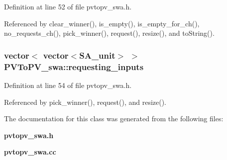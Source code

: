 Definition at line 52 of file pvtopv\_\-swa.h.

Referenced by clear\_\-winner(), is\_\-empty(), is\_\-empty\_\-for\_\-ch(), no\_\-requests\_\-ch(), pick\_\-winner(), request(), resize(), and toString().
\subsubsection[{requesting\_\-inputs}]{\setlength{\rightskip}{0pt plus 5cm}vector$<$ vector$<${\bf SA\_\-unit}$>$ $>$ {\bf PVToPV\_\-swa::requesting\_\-inputs}\hspace{0.3cm}{\tt  [private]}}\label{classPVToPV__swa_6e3038c4de5899eded85a6d71cf55786}




Definition at line 54 of file pvtopv\_\-swa.h.

Referenced by pick\_\-winner(), request(), and resize().

The documentation for this class was generated from the following files:\begin{CompactItemize}
\item 
{\bf pvtopv\_\-swa.h}\item 
{\bf pvtopv\_\-swa.cc}\end{CompactItemize}
